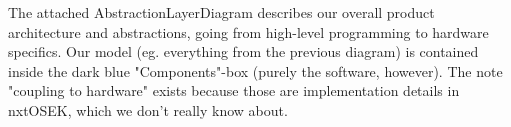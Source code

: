The attached AbstractionLayerDiagram describes our overall product architecture and abstractions, going from high-level programming to hardware specifics. Our model (eg. everything from the previous diagram) is contained inside the dark blue "Components"-box (purely the software, however). The note "coupling to hardware" exists because those are implementation details in nxtOSEK, which we don't really know about.


%

